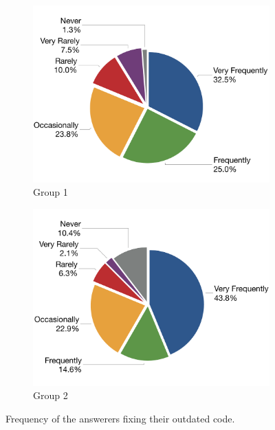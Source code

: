 \documentclass[10pt,journal,compsoc]{IEEEtran}
\begin{document}
\begin{figure}
	\begin{subfigure}{.25\textwidth}
		\centering
		\includegraphics[width=\linewidth]{survey_outdated_fix_1}
		\caption{Group 1}
		\label{fig:survey_outdated_fix_1}
	\end{subfigure}%
	\begin{subfigure}{.25\textwidth}
		\centering
		\includegraphics[width=\linewidth]{survey_outdated_fix_2}
		\caption{Group 2}
		\label{fig:survey_outdated_fix_2}
	\end{subfigure}
	\caption{Frequency of the answerers fixing their outdated code.}
	\label{fig:survey_outdated_fix}
\end{figure}
\end{document}
